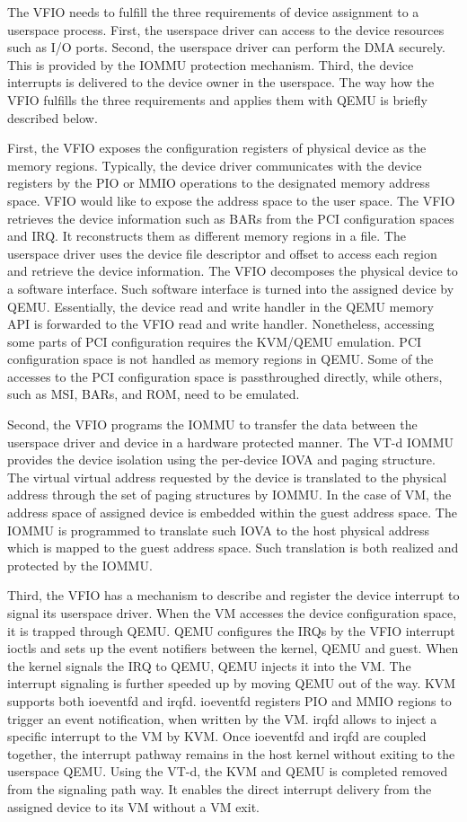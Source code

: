 The VFIO needs to fulfill the three requirements of device
assignment to a userspace process. First, the userspace driver
can access to the device resources such as I/O ports. Second,
the userspace driver can perform the DMA securely. This is
provided by the IOMMU protection mechanism. Third, the device
interrupts is delivered to the device owner in the userspace.
The way how the VFIO fulfills the three requirements and
applies them with QEMU is briefly described below.

First, the VFIO exposes the configuration registers of
physical device as the memory regions. Typically, the device
driver communicates with the device registers by the PIO or
MMIO operations to the designated memory address space. VFIO
would like to expose the address space to the user space. The
VFIO retrieves the device information such as BARs from the
PCI configuration spaces and IRQ. It reconstructs them as
different memory regions in a file. The userspace driver uses
the device file descriptor and offset to access each region
and retrieve the device information. The VFIO decomposes the
physical device to a software interface. Such software
interface is turned into the assigned device by QEMU.
Essentially, the device read and write handler in the QEMU
memory API is forwarded to the VFIO read and write handler.
Nonetheless, accessing some parts of PCI configuration
requires the KVM/QEMU emulation. PCI configuration space is
not handled as memory regions in QEMU. Some of the accesses to
the PCI configuration space is passthroughed directly, while
others, such as MSI, BARs, and ROM, need to be emulated.

Second, the VFIO programs the IOMMU to transfer the data
between the userspace driver and device in a hardware
protected manner. The VT-d IOMMU provides the device isolation
using the per-device IOVA and paging structure. The virtual
virtual address requested by the device is translated to the
physical address through the set of paging structures by
IOMMU. In the case of VM, the address space of assigned device
is embedded within the guest address space. The IOMMU is
programmed to translate such IOVA to the host physical address
which is mapped to the guest address space. Such translation
is both realized and protected by the IOMMU.

Third, the VFIO has a mechanism to describe and register the
device interrupt to signal its userspace driver. When the VM
accesses the device configuration space, it is trapped through
QEMU. QEMU configures the IRQs by the VFIO interrupt ioctls
and sets up the event notifiers between the kernel, QEMU and
guest. When the kernel signals the IRQ to QEMU, QEMU injects
it into the VM. The interrupt signaling is further speeded up
by moving QEMU out of the way. KVM supports both ioeventfd and
irqfd. ioeventfd registers PIO and MMIO regions to trigger an
event notification, when written by the VM. irqfd allows to
inject a specific interrupt to the VM by KVM. Once ioeventfd
and irqfd are coupled together, the interrupt pathway remains
in the host kernel without exiting to the userspace QEMU.
Using the VT-d, the KVM and QEMU is completed removed from the
signaling path way. It enables the direct interrupt delivery
from the assigned device to its VM without a VM exit.


